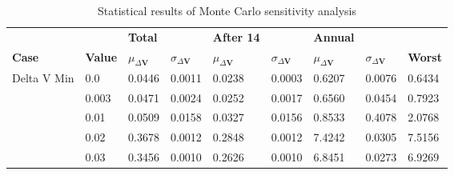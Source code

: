 \begin{table}[H]
\centering
\begin{tabular}{lllllllll}
 &  & \cellcolor[HTML]{EFEFEF}\textbf{Total} &  & \cellcolor[HTML]{EFEFEF}\textbf{After 14} & & \cellcolor[HTML]{EFEFEF}\textbf{Annual} & &\\
\rowcolor[HTML]{EFEFEF} 
\textbf{Case} & \textbf{Value} & \textbf{$\mu_{\Delta \boldsymbol{V}}$} & \textbf{$\sigma_{\Delta \boldsymbol{V}}$} & \textbf{$\mu_{\Delta \boldsymbol{V}}$} & \textbf{$\sigma_{\Delta \boldsymbol{V}}$} & \textbf{$\mu_{\Delta \boldsymbol{V}}$} & \textbf{$\sigma_{\Delta \boldsymbol{V}}$} & \textbf{Worst} \\ 
Delta V Min & 0.0 & 0.0446 & 0.0011 & 0.0238 & 0.0003 & 0.6207 & 0.0076 & 0.6434 \\ 
 & 0.003 & 0.0471 & 0.0024 & 0.0252 & 0.0017 & 0.6560 & 0.0454 & 0.7923 \\ 
 & 0.01 & 0.0509 & 0.0158 & 0.0327 & 0.0156 & 0.8533 & 0.4078 & 2.0768 \\ 
 & 0.02 & 0.3678 & 0.0012 & 0.2848 & 0.0012 & 7.4242 & 0.0305 & 7.5156 \\ 
 & 0.03 & 0.3456 & 0.0010 & 0.2626 & 0.0010 & 6.8451 & 0.0273 & 6.9269 \\ 
\end{tabular}
\caption{Statistical results of Monte Carlo sensitivity analysis}
\label{tab:SensitivityAnalysis}
\end{table}